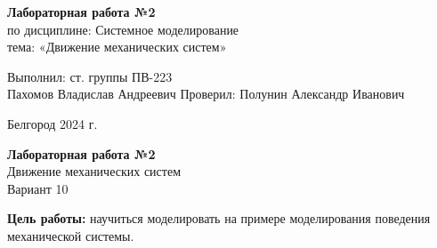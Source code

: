 \documentclass[a4paper,14pt]{extarticle}
\newcommand\textbox[1]{
	\parbox{.45\textwidth}{#1}
}
\begin{document}
\vfill
\begin{center}
    \large{
        \textbf{
            Лабораторная работа №2}}\\
    \normalsize{
        по дисциплине: Системное моделирование \\
        тема: «Движение механических систем»}
\end{center}
\vfill
\hfill\textbox{
    Выполнил: ст. группы ПВ-223\\Пахомов Владислав Андреевич
    \bigbreak
    Проверил: Полунин Александр Иванович
}
\vfill\begin{center}
    Белгород 2024 г.
\end{center}
\newpage
\begin{center}
    \textbf{Лабораторная работа №2}\\
    Движение механических систем\\
    Вариант 10
\end{center}
\textbf{Цель работы: }научиться моделировать на примере моделирования поведения механической системы.
\end{document}
